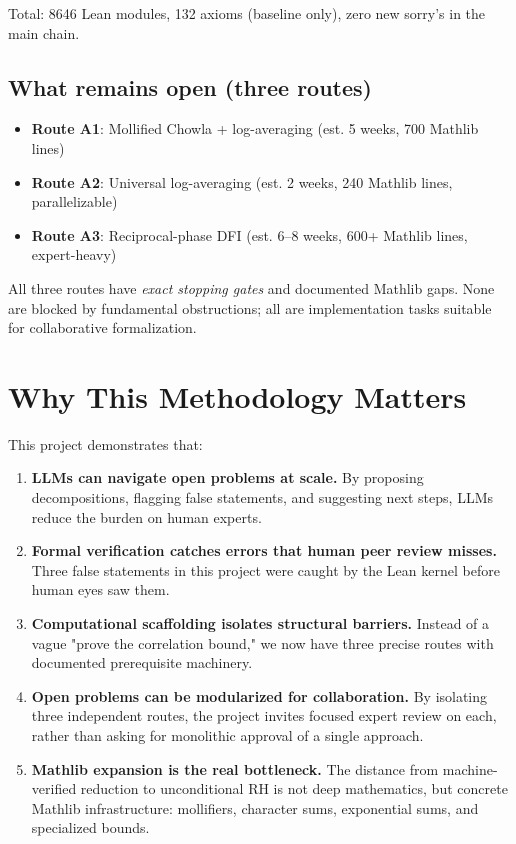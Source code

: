 \documentclass[11pt,a4paper]{article}
\begin{document}
Total: 8646 Lean modules, 132 axioms (baseline only), zero new sorry's in the main chain.

\subsection{What remains open (three routes)}

\begin{itemize}
\item \textbf{Route A1}: Mollified Chowla + log-averaging (est. 5 weeks, 700 Mathlib lines)
\item \textbf{Route A2}: Universal log-averaging (est. 2 weeks, 240 Mathlib lines, parallelizable)
\item \textbf{Route A3}: Reciprocal-phase DFI (est. 6--8 weeks, 600+ Mathlib lines, expert-heavy)
\end{itemize}

All three routes have \emph{exact stopping gates} and documented Mathlib gaps. None are blocked by fundamental obstructions; all are implementation tasks suitable for collaborative formalization.

\section{Why This Methodology Matters}

This project demonstrates that:

\begin{enumerate}
\item \textbf{LLMs can navigate open problems at scale.} By proposing decompositions, flagging false statements, and suggesting next steps, LLMs reduce the burden on human experts.

\item \textbf{Formal verification catches errors that human peer review misses.} Three false statements in this project were caught by the Lean kernel before human eyes saw them.

\item \textbf{Computational scaffolding isolates structural barriers.} Instead of a vague "prove the correlation bound," we now have three precise routes with documented prerequisite machinery.

\item \textbf{Open problems can be modularized for collaboration.} By isolating three independent routes, the project invites focused expert review on each, rather than asking for monolithic approval of a single approach.

\item \textbf{Mathlib expansion is the real bottleneck.} The distance from machine-verified reduction to unconditional RH is not deep mathematics, but concrete Mathlib infrastructure: mollifiers, character sums, exponential sums, and specialized bounds.
\end{enumerate}
\end{document}
